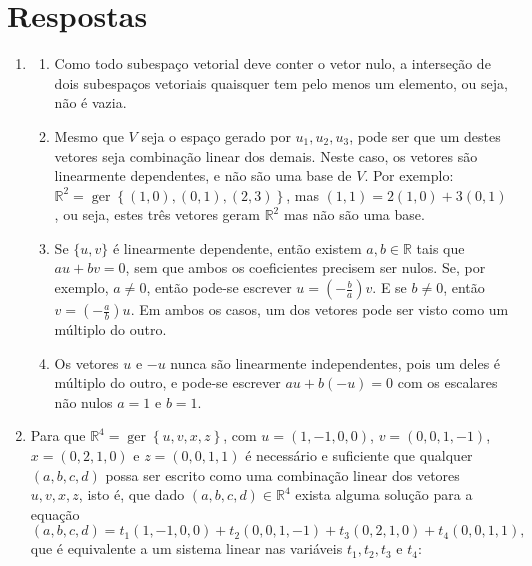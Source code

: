 \documentclass[12pt,a4paper]{article}
\newcommand*\ger[1]{\operatorname{ger}\left\{#1\right\}}
\newcommand*\R{\mathbb{R}}
\begin{document}
\newpage
\section*{Respostas}

\begin{enumerate}
\item 
\begin{enumerate}
\item Como todo subespaço vetorial deve conter o vetor nulo, a interseção de dois subespaços vetoriais quaisquer tem pelo menos um elemento, ou seja, não é vazia.
\item Mesmo que $V$ seja o espaço gerado por ${ u_1, u_2, u_3 }$, pode ser que um destes vetores seja combinação linear dos demais. Neste caso, os vetores são linearmente dependentes, e não são uma base de $V$. Por exemplo: $\R^2 = \ger{(1,0),(0,1),(2,3)}$, mas $(1,1) = 2(1,0)+3(0,1)$, ou seja, estes três vetores geram $\R^2$ mas não são uma base.
\item Se $\{u, v\}$ é linearmente dependente, então existem $a,b \in \R$ tais que $au+bv = 0$, sem que ambos os coeficientes precisem ser nulos. Se, por exemplo, $a \neq 0$, então pode-se escrever $u = (-\frac{b}{a}) v$. E se $b \neq 0$, então $v = (-\frac{a}{b}) u$. Em ambos os casos, um dos vetores pode ser visto como um múltiplo do outro.

\item Os vetores $u$ e $-u$ nunca são linearmente independentes, pois um deles é múltiplo do outro, e pode-se escrever $au + b(-u) = 0$ com os escalares não nulos $a=1$ e $b=1$.
\end{enumerate}

\item Para que $\R^4 = \ger{u,v,x,z}$, com $u=(1,-1,0,0)$, $v=(0,0,1,-1)$, $x=(0,2,1,0)$ e $z=(0,0,1,1)$ é necessário e suficiente que qualquer $(a,b,c,d)$ possa ser escrito como uma combinação linear dos vetores $u,v,x,z$, isto é, que dado $(a,b,c,d) \in \R^4$ exista alguma solução para a equação
\[
(a,b,c,d) = t_1 (1,-1,0,0) + t_2 (0,0,1,-1)+ t_3 (0,2,1,0)+ t_4 (0,0,1,1),
\]
que é equivalente a um sistema linear nas variáveis $t_1, t_2, t_3$ e $t_4$:



\end{enumerate}
\end{document}
